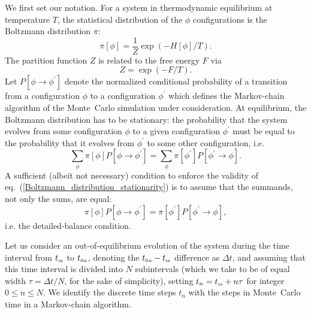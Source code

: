 \documentclass[11pt]{article}
\newcommand{\tin}{t_{\mbox{\tiny{in}}}}
\newcommand{\tfin}{t_{\mbox{\tiny{fin}}}}
\begin{document}
We first set our notation. For a system in thermodynamic equilibrium at temperature $T$, the statistical distribution of the $\phi$ configurations is the Boltzmann distribution $\pi$:
\begin{equation}
\label{Boltzmann_distribution}
\pi[\phi] = \frac{1}{Z} \exp \left( - H[\phi]/T \right).
\end{equation}
The partition function $Z$ is related to the free energy $F$ via
\begin{equation}
\label{partition_function_and_free_energy}
Z = \exp \left( - F/T \right).
\end{equation}
Let $P[\phi\to\phi^\prime]$ denote the normalized conditional probability of a transition from a configuration $\phi$ to a configuration $\phi^\prime$ which defines the Markov-chain algorithm of the Monte~Carlo simulation under consideration. At equilibrium, the Boltzmann distribution has to be stationary: the probability that the system evolves from some configuration $\phi$ to a given configuration $\phi^\prime$ must be equal to the probability that it evolves from $\phi^\prime$ to some other configuration, i.e.
\begin{equation}
\label{Boltzmann_distribution_stationarity}
\sum_\phi \pi[\phi] P[\phi\to\phi^\prime] = \sum_\phi \pi[\phi^\prime] P[\phi^\prime \to \phi].
\end{equation}
A sufficient (albeit not necessary) condition to enforce the validity of eq.~(\ref{Boltzmann_distribution_stationarity}) is to assume that the summands, not only the sums, are equal:
\begin{equation}
\label{detailed_balance}
\pi[\phi] P[\phi\to\phi^\prime] = \pi[\phi^\prime] P[\phi^\prime \to \phi],
\end{equation}
i.e. the detailed-balance condition.

Let us consider an out-of-equilibrium evolution of the system during the time interval from $\tin$ to $\tfin$, denoting the $\tfin-\tin$ difference as $\Delta t$, and assuming that this time interval is divided into $N$ subintervals (which we take to be of equal width $\tau=\Delta t /N$, for the sake of simplicity), setting $t_n=\tin + n \tau$ for integer $0 \le n \le N$. We identify the discrete time steps $t_n$ with the steps in Monte~Carlo time in a Markov-chain algorithm. 
\end{document}
